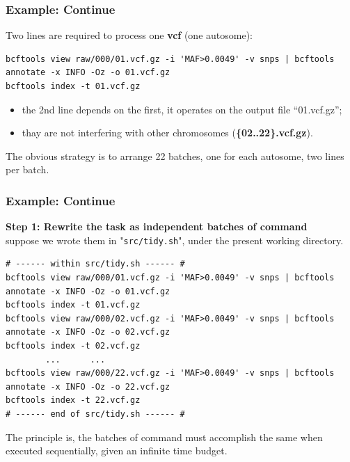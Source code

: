 \documentclass{beamer}
\begin{document}
\begin{frame}[fragile]
\frametitle{Example: Continue}
Two lines are required to process one \textbf{vcf} (one autosome):
\begin{lstlisting}
bcftools view raw/000/01.vcf.gz -i 'MAF>0.0049' -v snps | bcftools annotate -x INFO -Oz -o 01.vcf.gz
bcftools index -t 01.vcf.gz
\end{lstlisting}
\begin{itemize}
\item the 2nd line depends on the first, it operates on the output file ``01.vcf.gz'';
\item thay are not interfering with other chromosomes (\textbf{\{02..22\}.vcf.gz}).
\end{itemize}
The obvious strategy is to arrange 22 batches, one for each autosome, two lines per batch.
\end{frame}


\begin{frame}[fragile]
\frametitle{Example: Continue}
\textbf{Step 1: Rewrite the task as independent batches of command} \\
suppose we wrote them in "\verb|src/tidy.sh|", under the present working directory.
\begin{example}
\begin{lstlisting}
# ------ within src/tidy.sh ------ #
bcftools view raw/000/01.vcf.gz -i 'MAF>0.0049' -v snps | bcftools annotate -x INFO -Oz -o 01.vcf.gz
bcftools index -t 01.vcf.gz
bcftools view raw/000/02.vcf.gz -i 'MAF>0.0049' -v snps | bcftools annotate -x INFO -Oz -o 02.vcf.gz
bcftools index -t 02.vcf.gz
        ...      ...
bcftools view raw/000/22.vcf.gz -i 'MAF>0.0049' -v snps | bcftools annotate -x INFO -Oz -o 22.vcf.gz
bcftools index -t 22.vcf.gz
# ------ end of src/tidy.sh ------ #
\end{lstlisting}
\end{example}
The principle is, the batches of command must accomplish the same when executed sequentially, given an
infinite time budget.
\end{frame}

\end{document}
